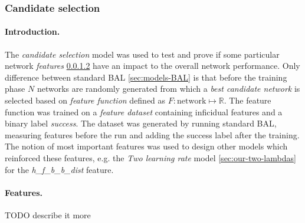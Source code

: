 \subsubsection{Candidate selection} 
\label{sec:our-candidates} 

\paragraph{Introduction.} 
The \emph{candidate selection} model was used to test and prove if some particular network \emph{features} \ref{sec:our-candidates-features} have an impact to the overall network performance. Only difference between standard BAL \ref{sec:models-BAL} is that before the training phase $N$ networks are randomly generated from which a \emph{best candidate network} is selected based on \emph{feature function} defined as $F: \mbox{network} \mapsto \mathbb{R}$. The feature function was trained on a \emph{feature dataset} containing inficidual features and a binary label \emph{success}. The dataset was generated by running standard BAL, measuring features before the run and adding the success label after the training. The notion of most important features was used to design other models which reinforced these features, e.g. the \emph{Two learning rate} model \ref{sec:our-two-lambdas} for the \emph{h\_f\_b\_b\_dist} feature. 

\paragraph{Features.}
\label{sec:our-candidates-features}

TODO describe it more

